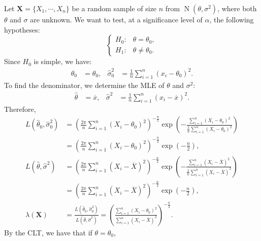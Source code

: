 \documentclass{huhtakm-template-book-v2}
\DeclareMathOperator{\N}{N}
\begin{document}
    \begin{eg}
        Let $\mathbf{X}=\{X_{1},\cdots,X_{n}\}$ be a random sample of size $n$ from $\N(\theta,\sigma^{2})$, where both $\theta$ and $\sigma$ are unknown. We want to test, at a significance level of $\alpha$, the following hypotheses:
        \begin{equation*}
            \begin{cases}
                H_{0}: &\theta=\theta_{0},\\
                H_{1}: &\theta\neq\theta_{0}.
            \end{cases}
        \end{equation*}
        Since $H_{0}$ is simple, we have:
        \begin{align*}
            \hat{\theta}_{0}&=\theta_{0}, & \hat{\sigma}_{0}^{2}&=\frac{1}{n}\sum_{i=1}^{n}(x_{i}-\theta_{0})^{2}.
        \end{align*}
        To find the denominator, we determine the MLE of $\theta$ and $\sigma^{2}$:
        \begin{align*}
            \hat{\theta}&=\overline{x}, & \hat{\sigma}^{2}&=\frac{1}{n}\sum_{i=1}^{n}(x_{i}-\overline{x})^{2}.
        \end{align*}
        Therefore,
        \begin{align*}
            L(\hat{\theta}_{0},\hat{\sigma}_{0}^{2})&=\left(\frac{2\pi}{n}\sum_{i=1}^{n}(X_{i}-\theta_{0})^{2}\right)^{-\frac{n}{2}}\exp\left(-\frac{\sum_{i=1}^{n}(X_{i}-\theta_{0})^{2}}{\frac{2}{n}\sum_{i=1}^{n}(X_{i}-\theta_{0})^{2}}\right)\\
            &=\left(\frac{2\pi}{n}\sum_{i=1}^{n}(X_{i}-\theta_{0})^{2}\right)^{-\frac{n}{2}}\exp\left(-\frac{n}{2}\right),\\
            L(\hat{\theta},\hat{\sigma}^{2})&=\left(\frac{2\pi}{n}\sum_{i=1}^{n}(X_{i}-\overline{X})^{2}\right)^{-\frac{n}{2}}\exp\left(-\frac{\sum_{i=1}^{n}(X_{i}-\overline{X})^{2}}{\frac{2}{n}\sum_{i=1}^{n}(X_{i}-\overline{X})^{2}}\right)\\
            &=\left(\frac{2\pi}{n}\sum_{i=1}^{n}(X_{i}-\overline{X})^{2}\right)^{-\frac{n}{2}}\exp\left(-\frac{n}{2}\right),\\
            \lambda(\mathbf{X})&=\frac{L(\hat{\theta}_{0},\hat{\sigma}_{0}^{2})}{L(\hat{\theta},\hat{\sigma}^{2})}=\left(\frac{\sum_{i=1}^{n}(X_{i}-\theta_{0})^{2}}{\sum_{i=1}^{n}(X_{i}-\overline{X})^{2}}\right)^{-\frac{n}{2}}.
        \end{align*}
        By the CLT, we have that if $\theta=\theta_{0}$,

\end{eg}
\end{document}
